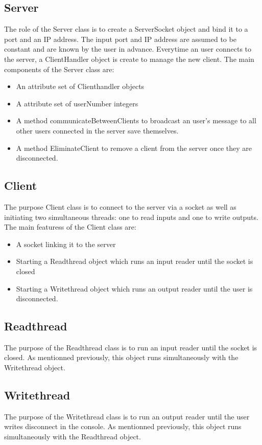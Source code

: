 \documentclass[11pt,letterpaper]{article}
\begin{document}
\subsection{Server}
The role of the Server class is to create a ServerSocket object and bind it to a port and an IP address. The input port and IP address are assumed to be constant and are known by the user in advance. Everytime an user connects to the server, a ClientHandler object is create to manage the new client. The main components of the Server class are:

\begin{itemize}
  \item An attribute set of Clienthandler objects
  \item A attribute set of userNumber integers
\item A method communicateBetweenClients to broadcast an user's message to all other users connected in the server save themselves.
\item A method EliminateClient to remove a client from the server once they are disconnected.
\end{itemize}

\subsection{Client}
The purpose Client class is to connect to the server via a socket as well as initiating two simultaneous threads: one to read inputs and one to write outputs. The main featuress of the Client class are:
\begin{itemize}
  \item A socket linking it to the server
  \item Starting a Readthread object which runs an input reader until the socket is closed
  \item Starting a Writethread object which runs an output reader until the user is disconnected.
\end{itemize}

\subsection{Readthread}
The purpose of the Readthread class is to run an input reader until the socket is closed. As mentionned previously, this object runs simultaneously with the Writethread object.

\subsection{Writethread}
The purpose of the Writethread class is to run an output reader until the user writes disconnect in the console. As mentionned previously, this object runs simultaneously with the Readthread object.
\end{document}
